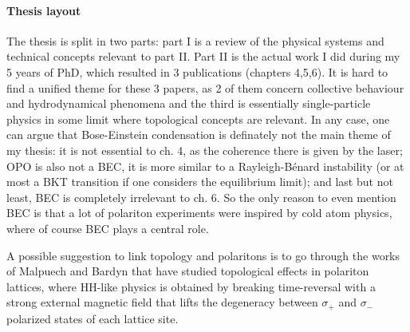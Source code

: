 \paragraph{Thesis layout}
The thesis is split in two parts: part I is a review of the physical
systems and technical concepts relevant to part II. Part II is the
actual work I did during my 5 years of PhD, which resulted in 3
publications (chapters 4,5,6). It is hard to find a unified theme for
these 3 papers, as 2 of them concern collective behaviour and
hydrodynamical phenomena and the third is essentially single-particle
physics in some limit where topological concepts are relevant. In any
case, one can argue that Bose-Einstein condensation is definately not
the main theme of my thesis: it is not essential to ch. 4, as the
coherence there is given by the laser; OPO is also not a BEC, it is
more similar to a Rayleigh-Bénard instability (or at most a BKT
transition if one considers the equilibrium limit); and last but not
least, BEC is completely irrelevant to ch. 6. So the only reason to
even mention BEC is that a lot of polariton experiments were inspired
by cold atom physics, where of course BEC plays a central role.



A possible suggestion to link topology and polaritons is to go through
the works of Malpuech and Bardyn that have studied topological effects
in polariton lattices, where HH-like physics is obtained by breaking
time-reversal with a strong external magnetic field that lifts the
degeneracy between $\sigma_+$ and $\sigma_-$ polarized states of each
lattice site.




